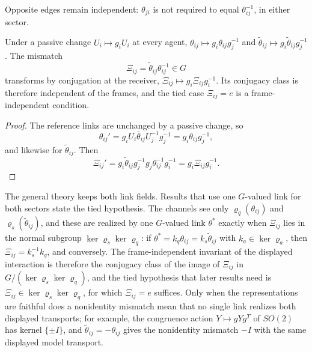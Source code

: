Opposite edges remain independent: $\theta_{ji}$ is not required to equal $\theta_{ij}^{-1}$, in either sector.

Under a passive change $U_i\mapsto g_iU_i$ at every agent, $\theta_{ij}\mapsto g_i\theta_{ij}g_j^{-1}$ and $\tilde\theta_{ij}\mapsto g_i\tilde\theta_{ij}g_j^{-1}$. The mismatch
\begin{equation}
\Xi_{ij}=\tilde\theta_{ij}\theta_{ij}^{-1}\in G
\label{eq:int-mismatch}
\end{equation}
transforms by conjugation at the receiver, $\Xi_{ij}\mapsto g_i\Xi_{ij}g_i^{-1}$. Its conjugacy class is therefore independent of the frames, and the tied case $\Xi_{ij}=e$ is a frame-independent condition.
\begin{proof}
The reference links are unchanged by a passive change, so
\begin{equation}
\theta_{ij}'=g_iU_i\bar\theta_{ij}U_j^{-1}g_j^{-1}=g_i\theta_{ij}g_j^{-1},
\end{equation}
and likewise for $\tilde\theta_{ij}$. Then
\begin{equation}
\Xi_{ij}'=g_i\tilde\theta_{ij}g_j^{-1}g_j\theta_{ij}^{-1}g_i^{-1}=g_i\Xi_{ij}g_i^{-1}.
\end{equation}
\end{proof}

The general theory keeps both link fields. Results that use one $G$-valued link for both sectors state the tied hypothesis. The channels see only $\varrho_q(\theta_{ij})$ and $\varrho_s(\tilde\theta_{ij})$, and these are realized by one $G$-valued link $\theta^*$ exactly when $\Xi_{ij}$ lies in the normal subgroup $\ker\varrho_s\ker\varrho_q$: if $\theta^*=k_q\theta_{ij}=k_s\tilde\theta_{ij}$ with $k_a\in\ker\varrho_a$, then $\Xi_{ij}=k_s^{-1}k_q$, and conversely. The frame-independent invariant of the displayed interaction is therefore the conjugacy class of the image of $\Xi_{ij}$ in $G/(\ker\varrho_s\ker\varrho_q)$, and the tied hypothesis that later results need is $\Xi_{ij}\in\ker\varrho_s\ker\varrho_q$, for which $\Xi_{ij}=e$ suffices. Only when the representations are faithful does a nonidentity mismatch mean that no single link realizes both displayed transports; for example, the congruence action $Y\mapsto gYg^T$ of $SO(2)$ has kernel $\{\pm I\}$, and $\tilde\theta_{ij}=-\theta_{ij}$ gives the nonidentity mismatch $-I$ with the same displayed model transport.

